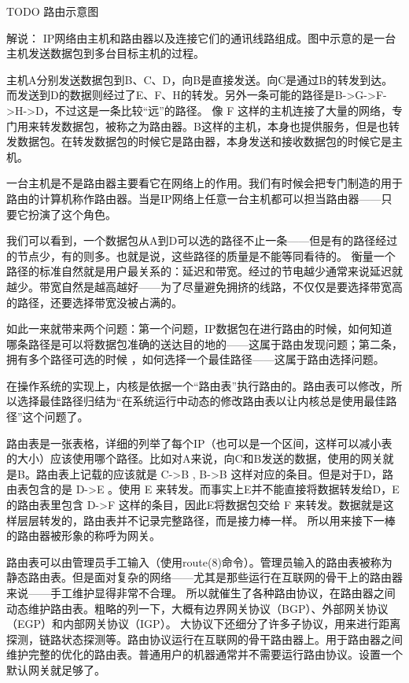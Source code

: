 TODO 路由示意图

解说： IP网络由主机和路由器以及连接它们的通讯线路组成。图中示意的是一台主机发送数据包到多台目标主机的过程。

主机A分别发送数据包到B、C、D，向B是直接发送。向C是通过B的转发到达。而发送到D的数据则经过了E、F、H的转发。另外一条可能的路径是B->G->F->H->D，不过这是一条比较“远”的路径。
像 F 这样的主机连接了大量的网络，专门用来转发数据包，被称之为路由器。B这样的主机，本身也提供服务，但是也转发数据包。在转发数据包的时候它是路由器，本身发送和接收数据包的时候它是主机。

一台主机是不是路由器主要看它在网络上的作用。我们有时候会把专门制造的用于路由的计算机称作路由器。当是IP网络上任意一台主机都可以担当路由器——只要它扮演了这个角色。

我们可以看到，一个数据包从A到D可以选的路径不止一条——但是有的路径经过的节点少，有的则多。也就是说，这些路径的质量是不能等同看待的。
衡量一个路径的标准自然就是用户最关系的：延迟和带宽。经过的节电越少通常来说延迟就越少。带宽自然是越高越好——为了尽量避免拥挤的线路，不仅仅是要选择带宽高的路径，还要选择带宽没被占满的。

如此一来就带来两个问题：第一个问题，IP数据包在进行路由的时候，如何知道哪条路径是可以将数据包准确的送达目的地的——这属于路由发现问题；第二条，拥有多个路径可选的时候 ，如何选择一个最佳路径——这属于路由选择问题。

在操作系统的实现上，内核是依据一个“路由表”执行路由的。路由表可以修改，所以选择最佳路径归结为“在系统运行中动态的修改路由表以让内核总是使用最佳路径”这个问题了。

路由表是一张表格，详细的列举了每个IP（也可以是一个区间，这样可以减小表的大小）应该使用哪个路径。比如对A来说，向C和B发送的数据，使用的网关就是B。路由表上记载的应该就是 C->B , B->B 这样对应的条目。但是对于D，路由表包含的是 D->E 。使用 E 来转发。而事实上E并不能直接将数据转发给D，E 的路由表里包含 D->F 这样的条目，因此E将数据包交给 F 来转发。数据就是这样层层转发的，路由表并不记录完整路径，而是接力棒一样。
所以用来接下一棒的路由器被形象的称呼为网关。

路由表可以由管理员手工输入（使用route(8)命令）。管理员输入的路由表被称为静态路由表。但是面对复杂的网络——尤其是那些运行在互联网的骨干上的路由器来说——手工维护显得非常不合理。
所以就催生了各种路由协议，在路由器之间动态维护路由表。粗略的列一下，大概有边界网关协议（BGP）、外部网关协议（EGP）和内部网关协议（IGP）。
大协议下还细分了许多子协议，用来进行距离探测，链路状态探测等。路由协议运行在互联网的骨干路由器上。用于路由器之间维护完整的优化的路由表。普通用户的机器通常并不需要运行路由协议。设置一个默认网关就足够了。

